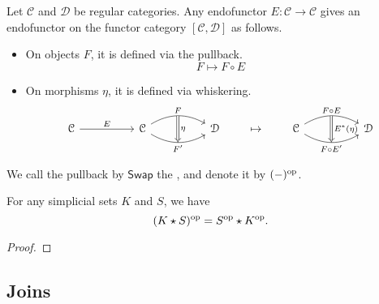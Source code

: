\documentclass[main.tex]{subfiles}
\begin{document}
Let $\mathcal{C}$ and $\mathcal{D}$ be regular categories. Any endofunctor $E\colon \mathcal{C} \to \mathcal{C}$ gives an endofunctor on the functor category $[\mathcal{C}, \mathcal{D}]$ as follows.
\begin{itemize}
  \item On objects $F$, it is defined via the pullback.
    \begin{equation*}
      F \mapsto F \circ E
    \end{equation*}

  \item On morphisms $\eta$, it is defined via whiskering.
    \begin{equation*}
      \begin{tikzcd}[column sep=huge]
        \mathcal{C}
        \arrow[r, "E"]
        &\mathcal{C}
        \arrow[r, bend left, "F"{name=U}]
        \arrow[r, bend right, swap, "F'"{name=D}]
        & \mathcal{D}
        \arrow[from=U, to=D, Rightarrow, "\eta"]
      \end{tikzcd}
      \qquad
      \mapsto
      \qquad
      \begin{tikzcd}[column sep=huge]
        \mathcal{C}
        \arrow[r, bend left, "F \circ E"{name=U}]
        \arrow[r, bend right, swap, "F \circ E'"{name=D}]
        & \mathcal{D}
        \arrow[from=U, to=D, Rightarrow, "E^{*}(\eta)"]
      \end{tikzcd}
    \end{equation*}

\end{itemize}
\begin{definition}
  \label{def:opposite_functor}
  We call the pullback by $\mathsf{Swap}$ the , and denote it by $(-)^{\mathrm{op}}$.
\end{definition}

\begin{theorem}
  For any simplicial sets $K$ and $S$, we have
  \begin{equation*}
    (K \star S)^{\mathrm{op}} = S^{\mathrm{op}} \star K^{\mathrm{op}}.
  \end{equation*}
\end{theorem}
\begin{proof}

\end{proof}

\subsection{Joins}
\label{ssc:joins}
\end{document}
